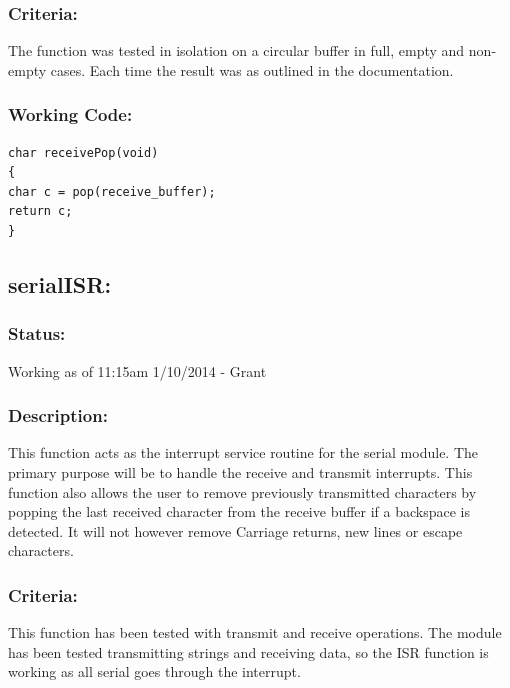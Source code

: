\documentclass[]{report}
\begin{document}
\subsubsection{Criteria:}
The function was tested in isolation on a circular buffer in full, empty and non-empty cases. Each time the result was as outlined in the documentation.

\subsubsection{Working Code:}
\begin{lstlisting}
char receivePop(void)
{
char c = pop(receive_buffer);
return c;
}
\end{lstlisting}

\subsection{serialISR:}
\subsubsection{Status:}
Working as of 11:15am 1/10/2014 - Grant

\subsubsection{Description:}
This function acts as the interrupt service routine for the serial module. The primary purpose will be to handle the receive and transmit interrupts. This function also allows the user to remove previously transmitted characters by popping the last received character from the receive buffer if a backspace is detected. It will not however remove Carriage returns, new lines or escape characters.

\subsubsection{Criteria:}
This function has been tested with transmit and receive operations. The module has been tested transmitting strings and receiving data, so the ISR function is working as all serial goes through the interrupt.
\end{document}
